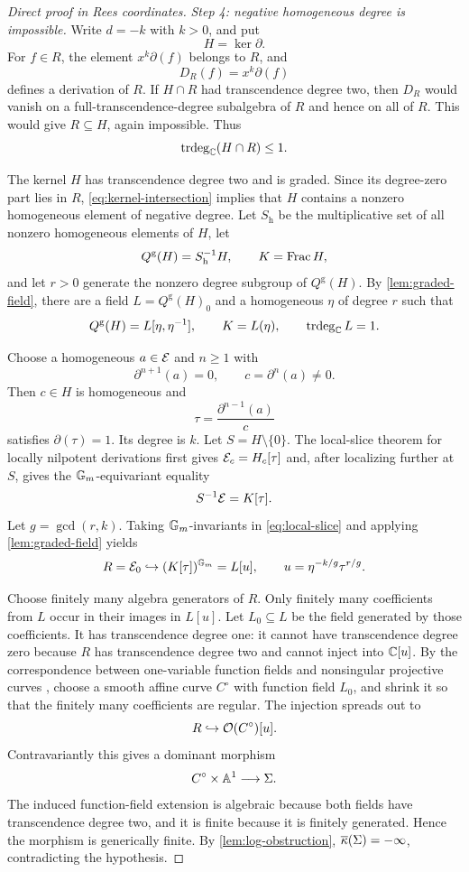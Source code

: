 \begin{proof}[Direct proof in Rees coordinates]
\smallskip
\noindent\emph{Step 4: negative homogeneous degree is impossible.}
Write $d=-k$ with $k>0$, and put
\[
  H=\ker\partial.
\]
For $f\in R$, the element $x^k\partial(f)$ belongs to $R$, and
\[
  D_R(f)=x^k\partial(f)
\]
defines a derivation of $R$.  If $H\cap R$ had transcendence degree two, then $D_R$ would vanish on a full-transcendence-degree subalgebra of $R$ and hence on all of $R$.  This would give $R\subseteq H$, again impossible.  Thus
\begin{equation}\label{eq:kernel-intersection}
  \operatorname{trdeg}_{\mathbb C}(H\cap R)\leq1.
\end{equation}

The kernel $H$ has transcendence degree two and is graded.  Since its degree-zero part lies in $R$, \eqref{eq:kernel-intersection} implies that $H$ contains a nonzero homogeneous element of negative degree.  Let $S_{\mathrm h}$ be the multiplicative set of all nonzero homogeneous elements of $H$, let
\[
  Q^{\mathrm g}(H)=S_{\mathrm h}^{-1}H,
  \qquad
  K=\operatorname{Frac} H,
\]
and let $r>0$ generate the nonzero degree subgroup of $Q^{\mathrm g}(H)$.  By \cref{lem:graded-field}, there are a field $L=Q^{\mathrm g}(H)_0$ and a homogeneous $\eta$ of degree $r$ such that
\[
  Q^{\mathrm g}(H)=L[\eta,\eta^{-1}],
  \qquad
  K=L(\eta),
  \qquad
  \operatorname{trdeg}_{\mathbb C}L=1.
\]

Choose a homogeneous $a\in \mathcal E$ and $n\geq1$ with
\[
  \partial^{n+1}(a)=0,
  \qquad
  c=\partial^n(a)\neq0.
\]
Then $c\in H$ is homogeneous and
\[
  \tau=\frac{\partial^{n-1}(a)}{c}
\]
satisfies $\partial(\tau)=1$.  Its degree is $k$.  Let $S=H\setminus\{0\}$.  The local-slice theorem for locally nilpotent derivations \cite[Section 1.3]{Freudenburg2017} first gives $\mathcal E_c=H_c[\tau]$ and, after localizing further at $S$, gives the $\mathbb G_m$-equivariant equality
\begin{equation}\label{eq:local-slice}
  S^{-1}\mathcal E=K[\tau].
\end{equation}
Let $g=\gcd(r,k)$.  Taking $\mathbb G_m$-invariants in \eqref{eq:local-slice} and applying \cref{lem:graded-field} yields
\[
  R=\mathcal E_0
  \hookrightarrow
  (K[\tau])^{\mathbb G_m}
  =L[u],
  \qquad
  u=\eta^{-k/g}\tau^{r/g}.
\]

Choose finitely many algebra generators of $R$.  Only finitely many coefficients from $L$ occur in their images in $L[u]$.  Let $L_0\subseteq L$ be the field generated by those coefficients.  It has transcendence degree one: it cannot have transcendence degree zero because $R$ has transcendence degree two and cannot inject into $\mathbb C[u]$.  By the correspondence between one-variable function fields and nonsingular projective curves \cite[Chapter I, Section 6]{Hartshorne1977}, choose a smooth affine curve $C^{\circ}$ with function field $L_0$, and shrink it so that the finitely many coefficients are regular.  The injection spreads out to
\[
  R\hookrightarrow\mathcal O(C^{\circ})[u].
\]
Contravariantly this gives a dominant morphism
\[
  C^{\circ}\times\mathbb A^1\longrightarrow\Sigma.
\]
The induced function-field extension is algebraic because both fields have transcendence degree two, and it is finite because it is finitely generated.  Hence the morphism is generically finite.  By \cref{lem:log-obstruction}, $\overline\kappa(\Sigma)=-\infty$, contradicting the hypothesis.


\end{proof}
